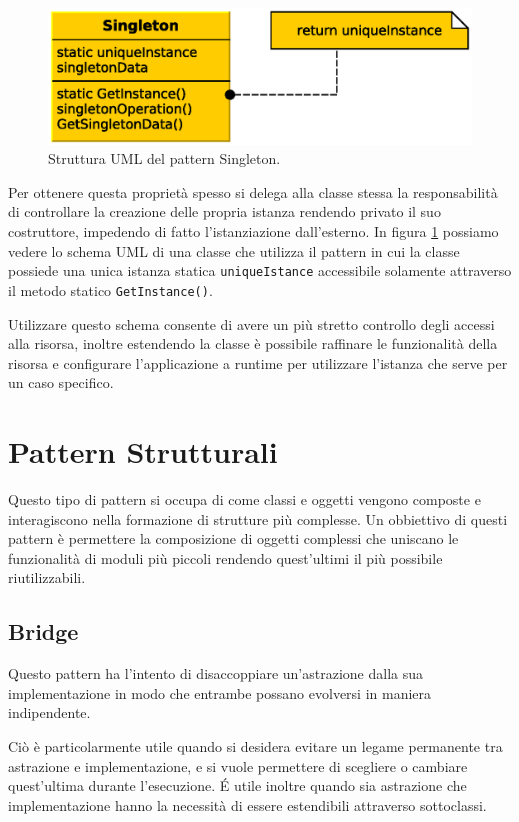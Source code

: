 \begin{figure}
\begin{center}
\includegraphics[width=12cm]{Immagini/SingletonPattern}
\caption{Struttura UML del pattern Singleton.\label{f:singletonpattern}}
\end{center} 
\end{figure}

Per ottenere questa propriet\`a spesso si delega alla classe stessa la responsabilit\`a di controllare la creazione delle propria istanza rendendo privato il suo costruttore, impedendo di fatto l'istanziazione dall'esterno. In figura \ref{f:singletonpattern} possiamo vedere lo schema \ac{UML} di una classe che utilizza il pattern in cui la classe possiede una unica istanza statica \texttt{uniqueIstance} accessibile solamente attraverso il metodo statico \texttt{GetInstance()}. 

Utilizzare questo schema consente di avere un pi\`u stretto controllo degli accessi alla risorsa, inoltre estendendo la classe \`e possibile raffinare le funzionalit\`a della risorsa e configurare l'applicazione a runtime per utilizzare l'istanza che serve per un caso specifico.

\section{Pattern Strutturali}
Questo tipo di pattern si occupa di come classi e oggetti vengono composte e interagiscono nella formazione di strutture pi\`u complesse. 
Un obbiettivo di questi pattern \`e permettere la composizione di oggetti complessi che uniscano le funzionalit\`a di moduli pi\`u piccoli rendendo quest'ultimi il pi\`u possibile riutilizzabili.

\subsection{Bridge}
\label{sub:bridge}
Questo pattern ha l'intento di disaccoppiare un'astrazione dalla sua implementazione in modo che entrambe possano evolversi in maniera indipendente.

Ci\`o \`e particolarmente utile quando si desidera evitare un legame permanente tra astrazione e implementazione, e si vuole permettere di scegliere o cambiare quest'ultima durante l'esecuzione. \'E utile inoltre quando sia astrazione che implementazione hanno la necessit\`a di essere estendibili attraverso sottoclassi. 

